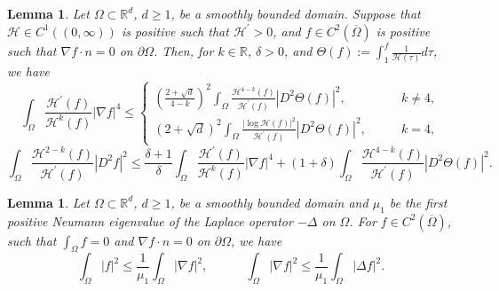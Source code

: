 \documentclass{amsart}
\newtheorem{lemma}[defn]{Lemma}
\numberwithin{equation}{section}
\newcommand{\R}{{ \mathbb{R}  }}
\newcommand{\bke}[1]{\left( #1 \right)}
\newcommand{\abs}[1]{\left| #1 \right|}
\begin{document}
\begin{lemma}\label{cruciallem}
Let $\Omega\subset \R^{d}$, $d\ge1$, be a smoothly bounded domain. Suppose that $\mathcal{H}\in C^{1}( (0,\infty)  )$ is positive such that $\mathcal{H}^{\prime}>0$, and $f\in C^{2}(\overline{\Omega})$ is positive such that $\nabla f\cdot n=0$ on $\partial\Omega$. Then, for $k\in\R$,  $\delta>0$, and  $\Theta(f):=\int_{1}^{f}\frac{1}{\mathcal{H}(\tau)}d\tau$,  we have
\begin{equation}\label{cruciallem_1}
\int_{\Omega}\frac{\mathcal{H}^{\prime}(f)}{\mathcal{H}^{k}(f)}\abs{\nabla f}^{4} \le
\left\{
\begin{array}{ll}
\displaystyle\bke{    \frac{2+\sqrt{d}}{4-k}     }^{2}\int_{\Omega}\frac{\mathcal{H}^{4-k}(f)}{\mathcal{H}^{\prime}(f)}\abs{D^{2}\Theta(f)     }^{2},\quad\quad&  k\neq4,\\
\displaystyle\bke{    2+\sqrt{d}     }^{2}\int_{\Omega}\frac{\abs{\log \mathcal{H}(f)}^{2}}{\mathcal{H}^{\prime}(f)}\abs{D^{2}\Theta(f)     }^{2},\quad\quad&  k=4,
\end{array}
\right.
\end{equation}
\begin{equation}\label{cruciallem_2}
\int_{\Omega}\!\!\frac{\mathcal{H}^{2-k}(f)}{\mathcal{H}^{\prime}(f)}\abs{  D^{2}f    }^{2}\le\frac{\delta+1}{\delta}\!\int_{\Omega}\frac{\mathcal{H}^{\prime}(f)}{\mathcal{H}^{k}(f)}\abs{\nabla f}^{4}+\bke{1+\delta}\!\!\int_{\Omega}\!\!\frac{\mathcal{H}^{4-k}(f)}{\mathcal{H}^{\prime}(f)}\abs{D^{2}\Theta(f)     }^{2}.
\end{equation}
\end{lemma}
\begin{lemma}\label{lem3prop2}
Let $\Omega\subset \R^{d}$, $d\ge1$, be a smoothly bounded domain and $\mu_1$ be the first positive Neumann eigenvalue of the Laplace operator $-\Delta$ on $\Omega$. For $f\in C^{2}(\overline{\Omega})$, such that $\int_{\Omega}f=0$ and $\nabla f\cdot n=0$ on $\partial\Omega$, we have
\[
\int_{\Omega}\abs{ f}^{2}\le \frac{1}{\mu_{1}} \int_{\Omega}\abs{\nabla f}^{2},\quad\qquad \int_{\Omega}\abs{\nabla f}^{2}\le \frac{1}{\mu_{1}} \int_{\Omega}\abs{\Delta f}^{2}.
\]
\end{lemma}
\end{document}
